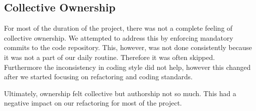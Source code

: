 \subsection{Collective Ownership}
For most of the duration of the project, there was not a complete feeling of collective ownership. We attempted to address this by enforcing mandatory commits to the code repository. This, however, was not done consistently because it was not a part of our daily routine. Therefore it was often skipped. Furthermore the inconsistency in coding style did not help, however this changed after we started focusing on refactoring and coding standards.

 Ultimately, ownership felt collective but authorship not so much. This had a negative impact on our refactoring for most of the project.
 
